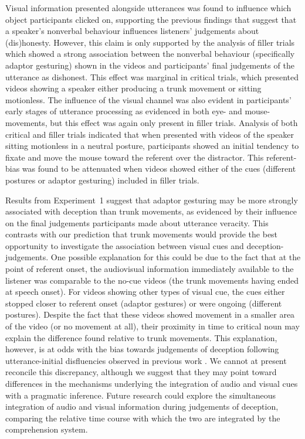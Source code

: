 \documentclass[a4paper,man,natbib]{apa6}
\begin{document}
Visual information presented alongside utterances was found to influence which object participants clicked on, supporting the previous findings that suggest that a speaker's nonverbal behaviour influences listeners' judgements about (dis)honesty.
However, this claim is only supported by the analysis of filler trials which showed a strong association between the nonverbal behaviour (specifically adaptor gesturing) shown in the videos and participants' final judgements of the utterance as dishonest. 
This effect was marginal in critical trials, which presented videos showing a speaker either producing a trunk movement or sitting motionless.
The influence of the visual channel was also evident in participants' early stages of utterance processing as evidenced in both eye- and mouse- movements, but this effect was again only present in filler trials.
Analysis of both critical and filler trials indicated that when presented with videos of the speaker sitting motionless in a neutral posture, participants showed an initial tendency to fixate and move the mouse toward the referent over the distractor.
This referent-bias was found to be attenuated when videos showed either of the cues (different postures or adaptor gesturing) included in filler trials.

Results from Experiment~1 suggest that adaptor gesturing may be more strongly associated with deception than trunk movements, as evidenced by their influence on the final judgements participants made about utterance veracity.
This contrasts with our prediction that trunk movements would provide the best opportunity to investigate the association between visual cues and deception-judgements.
One possible explanation for this could be due to the fact that at the point of referent onset, the audiovisual information immediately available to the listener was comparable to the no-cue videos (the trunk movements having ended at speech onset).
For videos showing other types of visual cue, the cues either stopped closer to referent onset (adaptor gestures) or were ongoing (different postures).
Despite the fact that these videos showed movement in a smaller area of the video (or no movement at all), their proximity in time to critical noun may explain the difference found relative to trunk movements.
This explanation, however, is at odds with the bias towards judgements of deception following utterance-initial disfluencies observed in previous work \citetext{\citet{Loy2017}, Experiment~1}.
We cannot at present reconcile this discrepancy, although we suggest that they may point toward differences in the mechanisms underlying the integration of audio and visual cues with a pragmatic inference.
Future research could explore the simultaneous integration of audio and visual information during judgements of deception, comparing the relative time course with which the two are integrated by the comprehension system.
\end{document}
